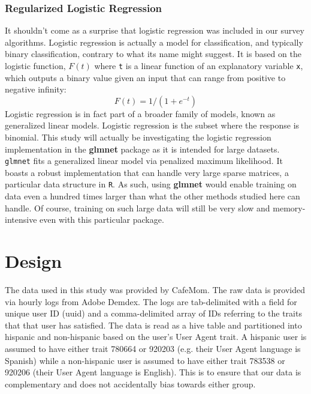 \documentclass[twoside]{article}
\begin{document}
\begin{multicols}{2}
\subsubsection{Regularized Logistic Regression}
It shouldn't come as a surprise that logistic regression was included in our survey algorithms. Logistic regression is actually a model for classification, and typically binary classification, contrary to what its name might suggest\cite{30}. It is based on the logistic function, \(F(t)\) where \texttt{t} is a linear function of an explanatory variable \texttt{x}, which outputs a binary value given an input that can range from positive to negative infinity\cite{10}:
\[ F(t) = 1/(1 + e^{-t}) \]
Logistic regression is in fact part of a broader family of models, known as generalized linear models. Logistic regression is the subset where the response is binomial\cite{32}. This study will actually be investigating the logistic regression implementation in the \textbf{glmnet} package as it is intended for large datasets. \texttt{glmnet} fits a generalized linear model via penalized maximum likelihood\cite{4}. It boasts a robust implementation that can handle very large sparse matrices\cite{6}, a particular data structure in \texttt{R}. As such, using \textbf{glmnet} would enable training on data even a hundred times larger than what the other methods studied here can handle. Of course, training on such large data will still be very slow and memory-intensive even with this particular package.


\section{Design}

The data used in this study was provided by CafeMom. The raw data is provided via hourly logs from Adobe Demdex. The logs are tab-delimited with a field for unique user ID (uuid) and a comma-delimited array of IDs referring to the traits that that user has satisfied. The data is read as a hive table and partitioned into hispanic and non-hispanic based on the user's User Agent trait. A hispanic user is assumed to have either trait 780664 or 920203 (e.g. their User Agent language is Spanish) while a non-hispanic user is assumed to have either trait 783538 or 920206 (their User Agent language is English). This is to ensure that our data is complementary and does not accidentally bias towards either group.


\end{multicols}
\end{document}
